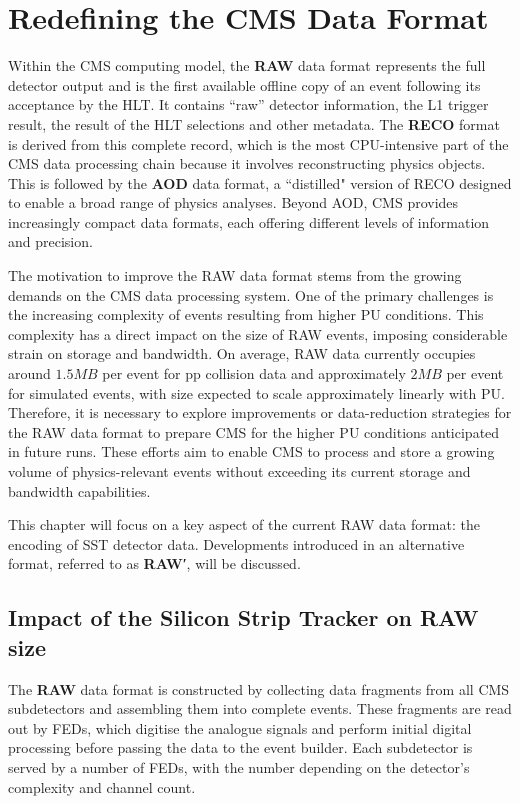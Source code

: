 \chapter{Redefining the CMS Data Format}
\thispagestyle{plain}  %
\pagestyle{chapterpages}
\label{Section:Chapter5}
\minitoc

Within the CMS computing model, the \textbf{RAW} data format represents the full detector output and is the first available offline copy of an event following its acceptance by the HLT. It contains ``raw'' detector information, the L1 trigger result, the result of the HLT selections and other metadata.  The \textbf{RECO} format is derived from this complete record, which is the most CPU-intensive part of the CMS data processing chain because it involves reconstructing physics objects. This is followed by the \textbf{AOD} data format, a ``distilled" version of RECO designed to enable a broad range of physics analyses. Beyond AOD, CMS provides increasingly compact data formats, each offering different levels of information and precision.

The motivation to improve the RAW data format stems from the growing demands on the CMS data processing system. One of the primary challenges is the increasing complexity of events resulting from higher PU conditions. This complexity has a direct impact on the size of RAW events, imposing considerable strain on storage and bandwidth.  On average, RAW data currently occupies around $1.5\unit{MB}$ per event for pp collision data and approximately $2\unit{MB}$ per event for simulated events, with size expected to scale approximately linearly with PU. Therefore, it is necessary to explore improvements or data-reduction strategies for the RAW data format to prepare CMS for the higher PU conditions anticipated in future runs. These efforts aim to enable CMS to process and store a growing volume of physics-relevant events without exceeding its current storage and bandwidth capabilities.

This chapter will focus on a key aspect of the current RAW data format: the encoding of SST detector data. Developments introduced in an alternative format, referred to as \textbf{RAW′}, will be discussed.

\section{Impact of the Silicon Strip Tracker on RAW size}
The \textbf{RAW} data format is constructed by collecting data fragments from all CMS subdetectors and assembling them into complete events. These fragments are read out by FEDs, which digitise the analogue signals and perform initial digital processing before passing the data to the event builder. Each subdetector is served by a number of FEDs, with the number depending on the detector's complexity and channel count.

